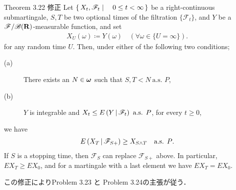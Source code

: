 	\begin{itembox}[l]{Theorem 3.22 修正}
		Let $\left\{\, X_t,\mathscr{F}_t \mid \quad 0 \leq t < \infty\, \right\}$ be a right-continuous submartingale,
		$S, T$ be two optional times of the filtration $\{\mathscr{F}_t\}$,
		and $Y$ be a $\mathscr{F}/\mathscr{B}(\mathbf{R})$-measurable function, and set
		\begin{align}
			X_U(\omega) \coloneqq Y(\omega)
			\quad (\forall \omega \in \{U = \infty\}).
		\end{align}
		for any random time $U$. Then, under either of the following two conditions;
		\begin{description}
			\item[(a)] There exists an $N \in {\boldsymbol \omega}$ such that $S,T < N\ \mbox{a.s. $P$}$,
			\item[(b)] $Y$ is integrable and $X_t \leq E\left( Y \, \middle|\, \mathscr{F}_t \right)\ \mbox{a.s. $P$}$, for every $t \geq 0$,
		\end{description}
		we have
		\begin{align}
			E\left( X_T \, \middle|\, \mathscr{F}_{S+} \right) \geq X_{S \wedge T}
			\quad \mbox{a.s. $P$}.
		\end{align}
		If $S$ is a stopping time, then $\mathscr{F}_S$ can replace $\mathscr{F}_{S+}$ above.
		In particular, $EX_T \geq EX_0$, and for a martingale with a last element we have $EX_T = EX_0$.
	\end{itembox}
	この修正によりProblem 3.23 と Problem 3.24の主張が従う．
